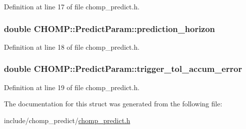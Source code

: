 Definition at line 17 of file chomp\+\_\+predict.\+h.

\subsubsection[{\texorpdfstring{prediction\+\_\+horizon}{prediction_horizon}}]{\setlength{\rightskip}{0pt plus 5cm}double C\+H\+O\+M\+P\+::\+Predict\+Param\+::prediction\+\_\+horizon}\hypertarget{struct_c_h_o_m_p_1_1_predict_param_a89a58ef3d9c88c23132ab5e7c64b9659}{}\label{struct_c_h_o_m_p_1_1_predict_param_a89a58ef3d9c88c23132ab5e7c64b9659}


Definition at line 18 of file chomp\+\_\+predict.\+h.

\subsubsection[{\texorpdfstring{trigger\+\_\+tol\+\_\+accum\+\_\+error}{trigger_tol_accum_error}}]{\setlength{\rightskip}{0pt plus 5cm}double C\+H\+O\+M\+P\+::\+Predict\+Param\+::trigger\+\_\+tol\+\_\+accum\+\_\+error}\hypertarget{struct_c_h_o_m_p_1_1_predict_param_a481fd775f165023e38e540757e0712ca}{}\label{struct_c_h_o_m_p_1_1_predict_param_a481fd775f165023e38e540757e0712ca}


Definition at line 19 of file chomp\+\_\+predict.\+h.



The documentation for this struct was generated from the following file\+:\begin{DoxyCompactItemize}
\item 
include/chomp\+\_\+predict/\hyperlink{chomp__predict_8h}{chomp\+\_\+predict.\+h}\end{DoxyCompactItemize}
